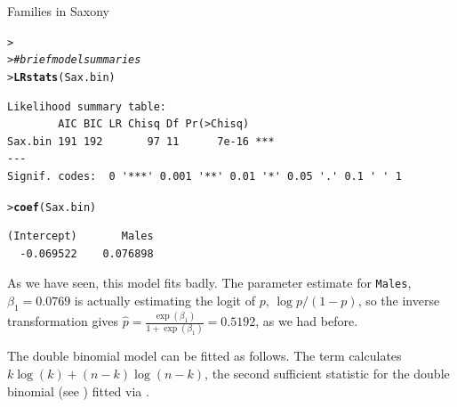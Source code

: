 \documentclass[10pt,krantz2]{krantz}\usepackage[]{graphicx}\usepackage[]{color}
\makeatletter
\newcommand{\hlcom}[1]{\textcolor[rgb]{0.678,0.584,0.686}{\textit{#1}}}%
\newcommand{\hlstd}[1]{\textcolor[rgb]{0.345,0.345,0.345}{#1}}%
\newcommand{\hlkwd}[1]{\textcolor[rgb]{0.737,0.353,0.396}{\textbf{#1}}}%
\newenvironment{kframe}{%
 \def\at@end@of@kframe{}%
 \ifinner\ifhmode%
  \def\at@end@of@kframe{\end{minipage}}%
  \begin{minipage}{\columnwidth}%
 \fi\fi%
 \def\FrameCommand##1{\hskip\@totalleftmargin \hskip-\fboxsep
 \colorbox{shadecolor}{##1}\hskip-\fboxsep
     \hskip-\linewidth \hskip-\@totalleftmargin \hskip\columnwidth}%
 \MakeFramed {\advance\hsize-\width
   \@totalleftmargin\z@ \linewidth\hsize
   \@setminipage}}%
 {\par\unskip\endMakeFramed%
 \at@end@of@kframe}
\newenvironment{knitrout}{}{} %
\renewenvironment{knitrout}{\small\renewcommand{\baselinestretch}{.85}}{} %
\makeatother
\begin{document}
\begin{Example}[saxony2]{Families in Saxony}
\begin{knitrout}
\begin{kframe}
\begin{alltt}
\hlstd{> }
\hlstd{> }\hlcom{# brief model summaries}
\hlstd{> }\hlkwd{LRstats}\hlstd{(Sax.bin)}
\end{alltt}
\begin{verbatim}
Likelihood summary table:
        AIC BIC LR Chisq Df Pr(>Chisq)    
Sax.bin 191 192       97 11      7e-16 ***
---
Signif. codes:  0 '***' 0.001 '**' 0.01 '*' 0.05 '.' 0.1 ' ' 1
\end{verbatim}
\begin{alltt}
\hlstd{> }\hlkwd{coef}\hlstd{(Sax.bin)}
\end{alltt}
\begin{verbatim}
(Intercept)       Males 
  -0.069522    0.076898 
\end{verbatim}
\end{kframe}
\end{knitrout}
As we have seen, this model fits badly.
The parameter estimate for \texttt{Males}, $\beta_1 = 0.0769$
is actually estimating the logit of $p$, $\log p / (1-p)$,
so the inverse transformation gives
$\hat{p} = \frac{\exp (\beta_1)}{1 + \exp (\beta_1)} = 0.5192$,
as we had before.


The double binomial model can be fitted as follows.
The term  calculates
$k \log(k) + (n-k) \log(n-k)$,
the second sufficient statistic for the double binomial
(see )
fitted via .


\end{Example}
\end{document}
